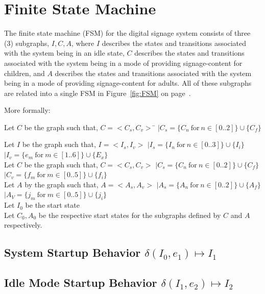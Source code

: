 \documentclass[10pt]{article}
\begin{document}
\section{Finite State Machine}

The finite state machine (FSM) for the digital signage system consists of three (3) subgraphs, $I, C, A$, where $I$ describes the states and transitions associated with the system being in an idle state, $C$ describes the states and transitions associated with the system being in a mode of providing signage-content for children, and $A$ describes the states and transitions associated with the system being in a mode of providing signage-content for adults. All of these subgraphs are related into a single FSM in Figure~\ref{fig:FSM} on page~\pageref{fig:FSM}.

More formally: 

\begin{tabbing}
	Let $C$ be the graph such that, $C = <C_{s}, C_{v}>$ \= $| C_{s} = \{C_{n}\ \textrm{for}\ n \in [0 .. 2]\} \cup \{C_{f}\}$ \kill 
	
	Let $I$ be the graph such that, $I = <I_{s}, I_{v}>$ \> $| I_{s} = \{I_{n}\ \textrm{for}\ n \in [0 .. 3]\} \cup \{I_{i}\}$ \\[0.5ex]
																		\> $| I_{v} = \{e_{m}\ \textrm{for}\ m \in [1 .. 6]\} \cup \{E_{x}\}$ \\[1em]
																		
	Let $C$ be the graph such that, $C = <C_{s}, C_{v}>$ \> $| C_{s} = \{C_{n}\ \textrm{for}\ n \in [0 .. 2]\} \cup \{C_{f}\}$ \\[0.5em]
																		\> $| C_{v} = \{f_{m}\ \textrm{for}\ m \in [0 .. 5]\} \cup \{f_{i}\}$ \\[1em]
																		
	Let $A$ by the graph such that, $A = <A_{s}, A_{v}>$ \> $| A_{s} = \{A_{n}\ \textrm{for}\ n \in [0 .. 2]\} \cup \{A_{f}\}$ \\[0.5ex]
																		\> $| A_{V} = \{j_{m}\ \textrm{for}\ m \in [0 .. 5]\} \cup \{j_{i}\}$\\[1em]
																		
	Let $I_{0}$ be the start state \\[1em]
	
	Let $C_{0}, A_{0}$ be the respective start states for the subgraphs defined by $C$ and $A$ respectively.
\end{tabbing}

\subsection{System Startup Behavior $\delta(I_{0}, e_{1}) \mapsto I_{1}$}

\subsection{Idle Mode Startup Behavior $\delta(I_{1}, e_{2}) \mapsto I_{2}$}
\end{document}
